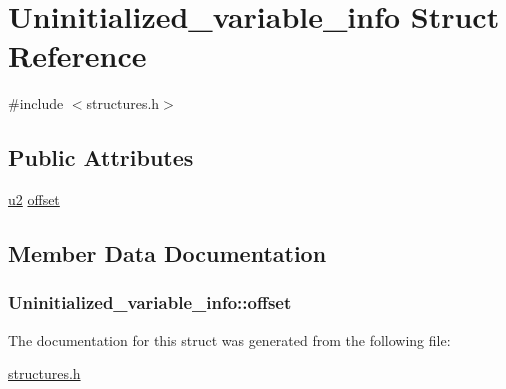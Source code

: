 \hypertarget{structUninitialized__variable__info}{}\section{Uninitialized\+\_\+variable\+\_\+info Struct Reference}
\label{structUninitialized__variable__info}


{\ttfamily \#include $<$structures.\+h$>$}

\subsection*{Public Attributes}
\begin{DoxyCompactItemize}
\item 
\hyperlink{structures_8h_a55ef8d87fd202b8417704c089899c5b9}{u2} \hyperlink{structUninitialized__variable__info_aa80d6f40ad156843843eedf9b03f9add}{offset}
\end{DoxyCompactItemize}


\subsection{Member Data Documentation}
\subsubsection[{\texorpdfstring{offset}{offset}}]{ Uninitialized\+\_\+variable\+\_\+info\+::offset}\hypertarget{structUninitialized__variable__info_aa80d6f40ad156843843eedf9b03f9add}{}\label{structUninitialized__variable__info_aa80d6f40ad156843843eedf9b03f9add}


The documentation for this struct was generated from the following file\+:\begin{DoxyCompactItemize}
\item 
\hyperlink{structures_8h}{structures.\+h}\end{DoxyCompactItemize}
